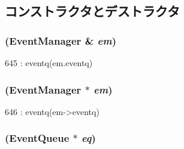 \subsection{コンストラクタとデストラクタ}
\hypertarget{classEventManager_a311f2d5c8b94bea825c05571dc4ca2e2}{
\subsubsection[{EventManager}]{ ({\bf EventManager} \& {\em em})}}
\label{classEventManager_a311f2d5c8b94bea825c05571dc4ca2e2}



\begin{DoxyCode}
645 : eventq(em.eventq) {}
\end{DoxyCode}
\hypertarget{classEventManager_a4aafa6652fafd95a60dd7e1a75393cd8}{
\subsubsection[{EventManager}]{ ({\bf EventManager} $\ast$ {\em em})}}
\label{classEventManager_a4aafa6652fafd95a60dd7e1a75393cd8}



\begin{DoxyCode}
646 : eventq(em->eventq) {}
\end{DoxyCode}
\hypertarget{classEventManager_ada835c7c11d268771405122be1ef29f0}{
\subsubsection[{EventManager}]{ ({\bf EventQueue} $\ast$ {\em eq})}}
\label{classEventManager_ada835c7c11d268771405122be1ef29f0}



